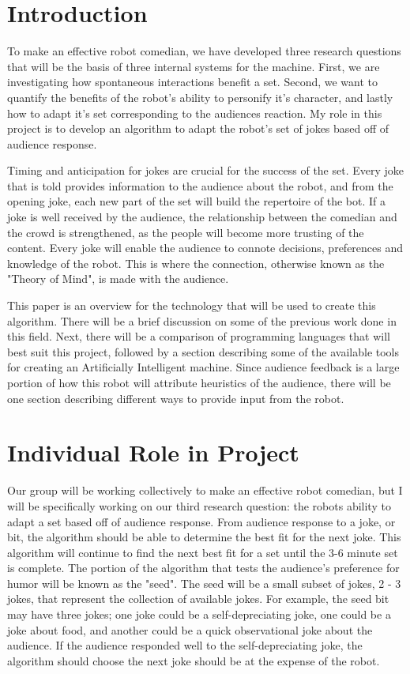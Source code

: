 \documentclass[onecolumn, draftclsnofoot,10pt, compsoc]{IEEEtran}
\begin{document}
\section{Introduction}

  To make an effective robot comedian, we have developed three research questions that will be the basis of three internal systems for the machine. First, we are investigating how spontaneous interactions benefit a set. Second, we want to quantify the benefits of the robot's ability to personify it's character, and lastly how to adapt it's set corresponding to the audiences reaction. My role in this project is to develop an algorithm to adapt the robot's set of jokes based off of audience response.

  Timing and anticipation for jokes are crucial for the success of the set. Every joke that is told provides information to the audience about the robot, and from the opening joke, each new part of the set will build the repertoire of the bot. If a joke is well received by the audience, the relationship between the comedian and the crowd is strengthened, as the people will become more trusting of the content. Every joke will enable the audience to connote decisions, preferences and knowledge of the robot. This is where the connection, otherwise known as the "Theory of Mind", is made with the audience\cite{leslie}.

  This paper is an overview for the technology that will be used to create this algorithm. There will be a brief discussion on some of the previous work done in this field. Next, there will be a comparison of programming languages that will best suit this project, followed by a section describing some of the available tools for creating an Artificially Intelligent machine. Since audience feedback is a large portion of how this robot will attribute heuristics of the audience, there will be one section describing different ways to provide input from the robot.

\section{Individual Role in Project}

Our group will be working collectively to make an effective robot comedian, but I will be specifically working on our third research question: the robots ability to adapt a set based off of audience response. From audience response to a joke, or bit, the algorithm should be able to determine the best fit for the next joke. This algorithm will continue to find the next best fit for a set until the 3-6 minute set is complete. The portion of the algorithm that tests the audience's preference for humor will be known as the "seed". The seed will be a small subset of jokes, 2 - 3 jokes, that represent the collection of available jokes. For example, the seed bit may have three jokes; one joke could be a self-depreciating joke, one could be a joke about food, and another could be a quick observational joke about the audience. If the audience responded well to the self-depreciating joke, the algorithm should choose the next joke should be at the expense of the robot. 
\end{document}
